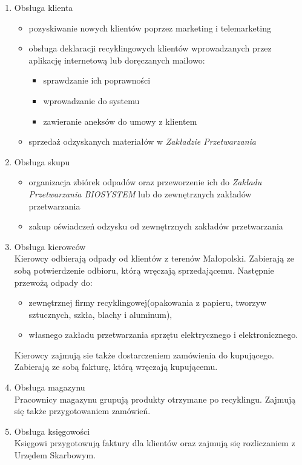 

\begin{enumerate}
	\item Obsługa klienta
		\begin{itemize}
			\item pozyskiwanie nowych klientów poprzez marketing i telemarketing
			\item obsługa deklaracji recyklingowych klientów wprowadzanych przez aplikację internetową lub doręczanych mailowo: 
				\begin{itemize}
					\item sprawdzanie ich poprawności
					\item wprowadzanie do systemu
					\item zawieranie aneksów do umowy z klientem
				\end{itemize}
			\item sprzedaż odzyskanych materiałów w \emph{Zakładzie Przetwarzania}
		\end{itemize}

	\item Obsługa skupu
		\begin{itemize}
			\item organizacja zbiórek odpadów oraz przeworzenie ich do \emph{Zakładu Przetwarzania BIOSYSTEM} lub do zewnętrznych zakładów przetwarzania
			\item zakup oświadczeń odzysku od zewnętrznych zakładów przetwarzania
		\end{itemize}

	\item Obsługa kierowców \\
	Kierowcy odbierają odpady od klientów z terenów Małopolski. Zabierają ze sobą potwierdzenie odbioru, którą wręczają sprzedającemu. Następnie przewożą odpady do:
		\begin{itemize}
			\item zewnętrznej firmy recyklingowej(opakowania z papieru, tworzyw sztucznych, szkła, blachy i aluminum),
			\item własnego zakładu przetwarzania sprzętu elektrycznego i elektronicznego.
		\end{itemize}
	Kierowcy zajmują sie także dostarczeniem zamówienia do kupującego. Zabierają ze sobą fakturę, którą wręczają kupującemu.

	\item Obsługa magazynu \\
	Pracownicy magazynu grupują produkty otrzymane po recyklingu. Zajmują się także przygotowaniem zamówień.

	\item Obsługa księgowości \\
	Księgowi przygotowują faktury dla klientów oraz zajmują się rozliczaniem z Urzędem Skarbowym.
\end{enumerate}
